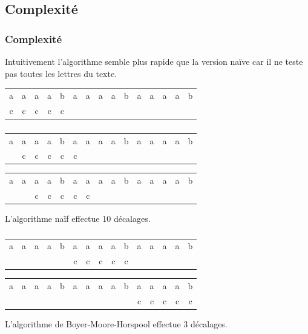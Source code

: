 \documentclass[svgnames,11pt]{beamer}
\begin{document}
\subsection{Complexité}
\begin{frame}
    \frametitle{Complexité}

    Intuitivement l'algorithme semble plus rapide que la version naïve car il ne teste pas toutes les lettres du texte.
\begin{center}
    \begin{tabular}{*{15}{c}}
        a&a&a&a&b&a&a&a&a&b&a&a&a&a&b\\
        c&c&c&c&c&&&&&&&&&&\\
    \end{tabular}
\end{center}

\end{frame}
\begin{frame}
    \frametitle{}

    \begin{center}
        \begin{tabular}{*{15}{c}}
            a&a&a&a&b&a&a&a&a&b&a&a&a&a&b\\
            &c&c&c&c&c&&&&&&&&&\\
        \end{tabular}
    \end{center}
    \begin{center}
        \begin{tabular}{*{15}{c}}
            a&a&a&a&b&a&a&a&a&b&a&a&a&a&b\\
            &&c&c&c&c&c&&&&&&&&\\
        \end{tabular}
    \end{center}
\begin{aretenir}[Observation]
L'algorithme naïf effectue 10 décalages.
\end{aretenir}
\end{frame}
\begin{frame}
    \frametitle{}

    \begin{center}
        \begin{tabular}{*{15}{c}}
            a&a&a&a&b&a&a&a&a&b&a&a&a&a&b\\
            &&&&&c&c&c&c&c&&&&&\\
        \end{tabular}
    \end{center}
    \begin{center}
        \begin{tabular}{*{15}{c}}
            a&a&a&a&b&a&a&a&a&b&a&a&a&a&b\\
            &&&&&&&&&&c&c&c&c&c\\
        \end{tabular}
    \end{center}
    \begin{aretenir}[Observation]
        L'algorithme de Boyer-Moore-Horspool effectue 3 décalages.
        \end{aretenir}
\end{frame}
\end{document}
